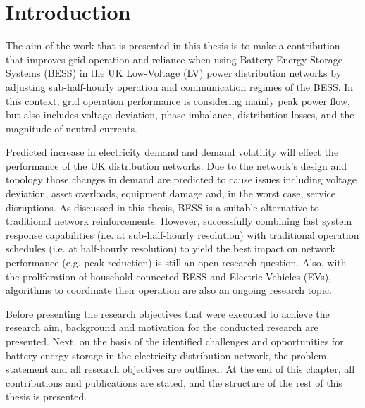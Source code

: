 \chapter{Introduction}
\label{ch-introduction}

The aim of the work that is presented in this thesis is to make a contribution that improves grid operation and reliance when using Battery Energy Storage Systems (BESS) in the UK Low-Voltage (LV) power distribution networks by adjusting sub-half-hourly operation and communication regimes of the BESS.
In this context, grid operation performance is considering mainly peak power flow, but also includes voltage deviation, phase imbalance, distribution losses, and the magnitude of neutral currents.

Predicted increase in electricity demand and demand volatility will effect the performance of the UK distribution networks.
Due to the network's design and topology those changes in demand are predicted to cause issues including voltage deviation, asset overloads, equipment damage and, in the worst case, service disruptions.
As discussed in this thesis, BESS is a suitable alternative to traditional network reinforcements.
However, successfully combining fast system response capabilities (i.e. at sub-half-hourly resolution) with traditional operation schedules (i.e. at half-hourly resolution) to yield the best impact on network performance (e.g. peak-reduction) is still an open research question.
Also, with the proliferation of household-connected BESS and Electric Vehicles (EVs), algorithms to coordinate their operation are also an ongoing research topic.

Before presenting the research objectives that were executed to achieve the research aim, background and motivation for the conducted research are presented.
Next, on the basis of the identified challenges and opportunities for battery energy storage in the electricity distribution network, the problem statement and all research objectives are outlined.
At the end of this chapter, all contributions and publications are stated, and the structure of the rest of this thesis is presented.









